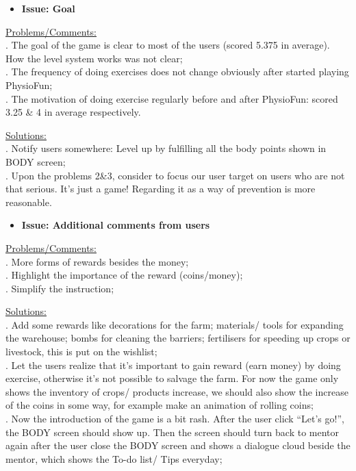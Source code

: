 \documentclass{article}
\begin{document}
\begin{itemize}
    \item{\textbf{Issue: Goal}}
\end{itemize}

\underline{Problems/Comments:} \\
. The goal of the game is clear to most of the users (scored 5.375 in average). How the level system works was not clear;\\
. The frequency of doing exercises does not change obviously after started playing PhysioFun;\\
. The motivation of doing exercise regularly before and after PhysioFun: scored 3.25 \& 4 in average respectively.

\underline{Solutions:} \\
. Notify users somewhere: Level up by fulfilling all the body points shown in BODY screen;\\
. Upon the problems 2\&3, consider to focus our user target on users who are not that serious. It’s just a game! Regarding it as a way of prevention is more reasonable.


\begin{itemize}
    \item{\textbf{Issue: Additional comments from users}}
\end{itemize}

\underline{Problems/Comments:} \\
. More forms of rewards besides the money;\\
. Highlight the importance of the reward (coins/money);\\
. Simplify the instruction;

\underline{Solutions:} \\
. Add some rewards like decorations for the farm; materials/ tools for expanding the warehouse; bombs for cleaning the barriers; fertilisers for speeding up crops or livestock, this is put on the wishlist;\\
. Let the users realize that it’s important to gain reward (earn money) by doing exercise, otherwise it’s not possible to salvage the farm. For now the game only shows the inventory of crops/ products increase, we should also show the increase of the coins in some way, for example make an animation of rolling coins;\\
. Now the introduction of the game is a bit rash.
After the user click “Let’s go!”, the BODY screen should show up. Then the screen should turn back to mentor again after the user close the BODY screen and shows a dialogue cloud beside the mentor, which shows the To-do list/ Tips everyday;\\
\end{document}
